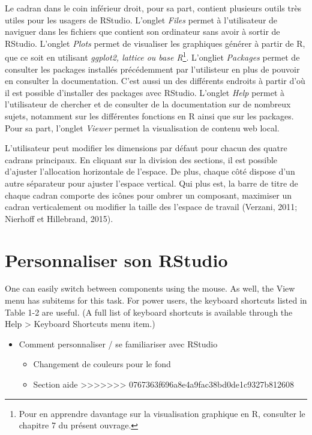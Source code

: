 \documentclass[
  letterpaper,
  DIV=11,
  numbers=noendperiod]{scrreprt}
\providecommand{\tightlist}{%
  \setlength{\itemsep}{0pt}\setlength{\parskip}{0pt}}\usepackage{longtable,booktabs,array}
\begin{document}
Le cadran dans le coin inférieur droit, pour sa part, contient plusieurs
outils très utiles pour les usagers de RStudio. L'onglet \emph{Files}
permet à l'utilisateur de naviguer dans les fichiers que contient son
ordinateur sans avoir à sortir de RStudio. L'onglet \emph{Plots} permet
de visualiser les graphiques générer à partir de R, que ce soit en
utilisant \emph{ggplot2, lattice ou base R}\footnote{Pour en apprendre
  davantage sur la visualisation graphique en R, consulter le chapitre 7
  du présent ouvrage.}. L'ongliet \emph{Packages} permet de consulter
les packages installés précédemment par l'utilisteur en plus de pouvoir
en consulter la documentation. C'est aussi un des différents endroits à
partir d'où il est possible d'installer des packages avec RStudio.
L'onglet \emph{Help} permet à l'utilisateur de chercher et de consulter
de la documentation sur de nombreux sujets, notamment sur les
différentes fonctions en R ainsi que sur les packages. Pour sa part,
l'onglet \emph{Viewer} permet la visualisation de contenu web local.

L'utilisateur peut modifier les dimensions par défaut pour chacun des
quatre cadrans principaux. En cliquant sur la division des sections, il
est possible d'ajuster l'allocation horizontale de l'espace. De plus,
chaque côté dispose d'un autre séparateur pour ajuster l'espace
vertical. Qui plus est, la barre de titre de chaque cadran comporte des
icônes pour ombrer un composant, maximiser un cadran verticalement ou
modifier la taille des l'espace de travail (Verzani, 2011; Nierhoff et
Hillebrand, 2015).

\hypertarget{personnaliser-son-rstudio}{%
\section{Personnaliser son RStudio}\label{personnaliser-son-rstudio}}

One can easily switch between components using the mouse. As well, the
View menu has subitems for this task. For power users, the keyboard
shortcuts listed in Table 1-2 are useful. (A full list of keyboard
shortcuts is available through the Help \textgreater{} Keyboard
Shortcuts menu item.)

\begin{itemize}
\tightlist
\item
  Comment personnaliser / se familiariser avec RStudio

  \begin{itemize}
  \tightlist
  \item
    Changement de couleurs pour le fond
  \item
    Section aide
    \textgreater\textgreater\textgreater\textgreater\textgreater\textgreater\textgreater{}
    0767363f696a8e4a9fac38bd0de1c9327b812608
  \end{itemize}
\end{itemize}
\end{document}

